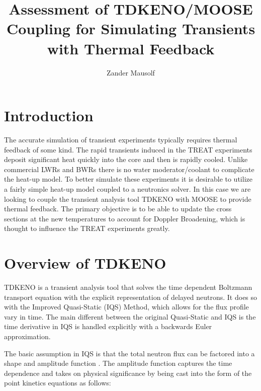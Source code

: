 \documentclass[11pt]{article}
\begin{document}
%
\author{Zander Mausolf}
\title{Assessment of TDKENO/MOOSE Coupling for Simulating Transients with Thermal Feedback}
\maketitle

\section{Introduction}
The accurate simulation of transient experiments typically requires thermal feedback of some kind.  The rapid transients induced in the TREAT experiments deposit significant heat quickly into the core and then is rapidly cooled.  Unlike commercial LWRs and BWRs there is no water moderator/coolant to complicate the heat-up model.  To better simulate these experiments it is desirable to utilize a fairly simple heat-up model coupled to a neutronics solver.  In this case we are looking to couple the transient analysis tool TDKENO with MOOSE to provide thermal feedback.  The primary objective is to be able to update the cross sections at the new temperatures to account for Doppler Broadening, which is thought to influence the TREAT experiments greatly.  

\section{Overview of TDKENO}

TDKENO is a transient analysis tool that solves the time dependent Boltzmann transport equation with the explicit representation of delayed neutrons. It does so with the Improved Quasi-Static (IQS) Method, which allows for the flux profile vary in time.  The main different between the original Quasi-Static and IQS is the time derivative in IQS is handled explicitly with a backwards Euler approximation. 

The basic assumption in IQS is that the total neutron flux can be factored into a shape and amplitude function \cite{goluoglu2001time}\cite{Gehin}.  The amplitude function captures the time dependence and takes on physical significance by being cast into the form of the point kinetics equations as follows:
\end{document}
